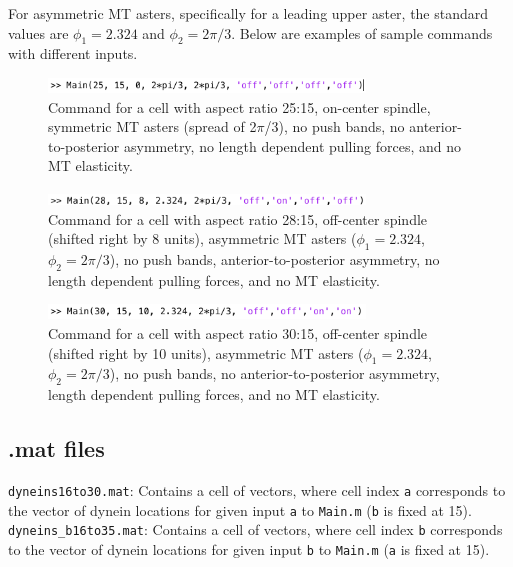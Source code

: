 \documentclass{article}
\begin{document}
\noindent For asymmetric MT asters, specifically for a leading upper aster, the standard values are $\phi_1 = 2.324$ and $\phi_2 = 2\pi/3$. Below are examples of sample commands with different inputs.

\begin{figure}[H]
\centering
\includegraphics[width=0.75\textwidth]{figures/sample1.png}
\caption{Command for a cell with aspect ratio 25:15, on-center spindle, symmetric MT asters (spread of 2$\pi$/3), no push bands, no anterior-to-posterior asymmetry, no length dependent pulling forces, and no MT elasticity.}
\end{figure}

\begin{figure}[H]
\centering
\includegraphics[width=0.75\textwidth]{figures/sample2.png}
\caption{Command for a cell with aspect ratio 28:15, off-center spindle (shifted right by 8 units), asymmetric MT asters ($\phi_1 = 2.324$, $\phi_2 = 2\pi/3$), no push bands, anterior-to-posterior asymmetry, no length dependent pulling forces, and no MT elasticity.}
\end{figure}

\begin{figure}[H]
\centering
\includegraphics[width=0.75\textwidth]{figures/sample3.png}
\caption{Command for a cell with aspect ratio 30:15, off-center spindle (shifted right by 10 units), asymmetric MT asters ($\phi_1 = 2.324$, $\phi_2 = 2\pi/3$), no push bands, no anterior-to-posterior asymmetry, length dependent pulling forces, and no MT elasticity.}
\end{figure}

\subsection{.mat files}
\noindent\texttt{dyneins16to30.mat}: Contains a cell of vectors, where cell index \texttt{a} corresponds to the vector of dynein locations for given input \texttt{a} to \texttt{Main.m} (\texttt{b} is fixed at 15). \\[3pt]

\noindent\texttt{dyneins\_b16to35.mat}: Contains a cell of vectors, where cell index \texttt{b} corresponds to the vector of dynein locations for given input \texttt{b} to \texttt{Main.m} (\texttt{a} is fixed at 15).\\[3pt]
\end{document}
